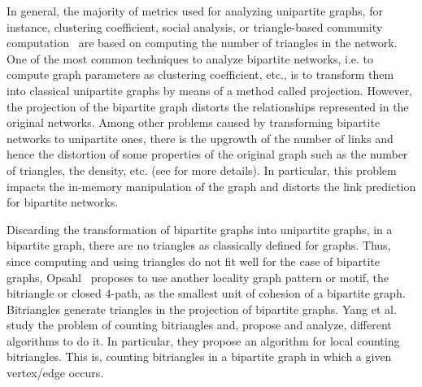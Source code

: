 %
In general, the majority of metrics used for analyzing unipartite graphs, for instance, clustering coefficient, social analysis, or triangle-based community computation~\cite{ccoef,detect_graph,Newman_2003} are based on computing the number of triangles in the network. 
One of the most common techniques to analyze bipartite networks, i.e. to compute graph parameters as clustering coefficient, etc., is to transform them into classical unipartite graphs by means of a method called projection. 
However, the projection of the bipartite graph distorts the relationships represented in the original networks. Among other problems caused by transforming bipartite networks to unipartite ones, there is the upgrowth of the number of links and hence the distortion of some properties of the original graph such as the number of triangles, the density, etc. (see \cite{latapy2008basic} for more details). 
In particular, this problem impacts the in-memory manipulation of the graph and distorts the link prediction for bipartite networks.

Discarding the transformation of bipartite graphs into unipartite graphs, in a bipartite graph, there are no triangles as classically defined for graphs. Thus, since computing and using triangles do not fit well for the case of bipartite graphs, Opsahl~\cite{opsahl} proposes to use another locality graph pattern or motif, the bitriangle or closed 4-path, as the smallest unit of cohesion of a bipartite graph. 
Bitriangles generate triangles in the projection of bipartite graphs. Yang et al.~\cite{btcount}  study the problem of counting bitriangles and, propose and analyze, different algorithms to do it. In particular, they propose an algorithm for local counting bitriangles. 
This is, counting bitriangles in a bipartite graph in which a given vertex/edge occurs.

